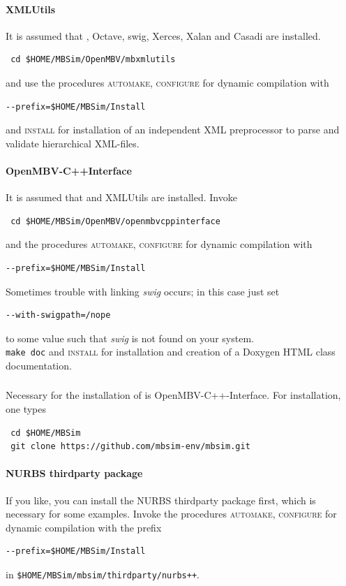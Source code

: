 \paragraph{XMLUtils}
It is assumed that \FMatVec{}, Octave, swig, Xerces, Xalan and Casadi are installed.
\begin{verbatim}
 cd $HOME/MBSim/OpenMBV/mbxmlutils
\end{verbatim} 
and use the procedures \textsc{automake}, \textsc{configure} for dynamic compilation with
\begin{verbatim}
--prefix=$HOME/MBSim/Install
\end{verbatim}
and \textsc{install} for installation of an independent XML preprocessor to parse and validate hierarchical XML-files.

\paragraph{OpenMBV-C++Interface}
It is assumed that \HDFSerie{} and XMLUtils are installed. Invoke
\begin{verbatim}
 cd $HOME/MBSim/OpenMBV/openmbvcppinterface
\end{verbatim} 
and the procedures \textsc{automake, configure} for dynamic compilation with
\begin{verbatim}
--prefix=$HOME/MBSim/Install
\end{verbatim}
Sometimes trouble with linking \emph{swig} occurs; in this case just set
\begin{verbatim}
--with-swigpath=/nope
\end{verbatim}
to some value such that \emph{swig} is not found on your system.\\
%
\texttt{make doc} and \textsc{install} for installation and creation of a Doxygen HTML class documentation. 
%
\subsubsection{\MBSim}
Necessary for the installation of \MBSim{} is OpenMBV-C++-Interface. For installation, one types
\begin{verbatim}
 cd $HOME/MBSim
 git clone https://github.com/mbsim-env/mbsim.git
\end{verbatim}
%
\paragraph{NURBS thirdparty package}
If you like, you can install the NURBS thirdparty package first, which is necessary for some examples. Invoke the procedures \textsc{automake, configure} for dynamic compilation with the prefix
\begin{verbatim}
--prefix=$HOME/MBSim/Install
\end{verbatim}
in \texttt{\$HOME/MBSim/mbsim/thirdparty/nurbs++}.
%

